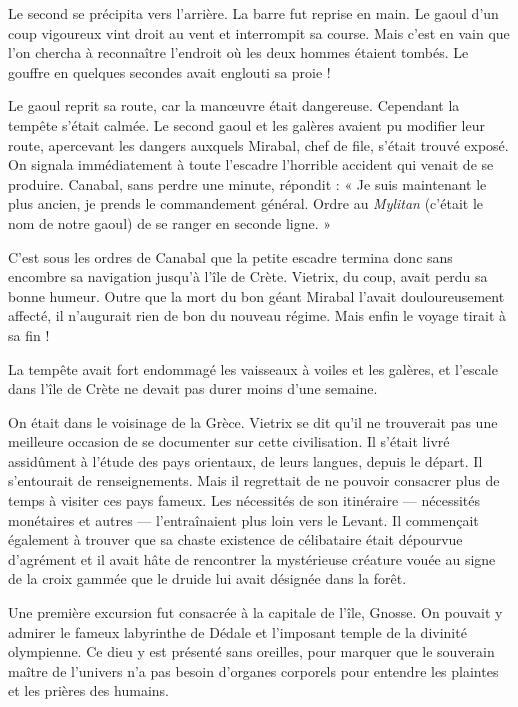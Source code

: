 \documentclass[a4paper, 11pt, oneside, polutonikogreek, french]{article}
\begin{document}
Le second se précipita vers l'arrière. La barre fut reprise en main. Le gaoul d'un coup vigoureux vint droit au vent et interrompit sa course. Mais c'est en vain que l'on chercha à reconnaître l'endroit où les deux hommes étaient tombés. Le gouffre en quelques secondes avait englouti sa proie !

Le gaoul reprit sa route, car la manœuvre était dangereuse. Cependant la tempête s'était calmée. Le second gaoul et les galères avaient pu modifier leur route, apercevant les dangers auxquels Mirabal, chef de file, s'était trouvé exposé. On signala immédiatement à toute l'escadre l'horrible accident qui venait de se produire. Canabal, sans perdre une minute, répondit : « Je suis maintenant le plus ancien, je prends le commandement général. Ordre au \emph{Mylitan} (c'était le nom de notre gaoul) de se ranger en seconde ligne. »

C'est sous les ordres de Canabal que la petite escadre termina donc sans encombre sa navigation jusqu'à l'île de Crète. Vietrix, du coup, avait perdu sa bonne humeur. Outre que la mort du bon géant Mirabal l'avait douloureusement affecté, il n'augurait rien de bon du nouveau régime. Mais enfin le voyage tirait à sa fin !

La tempête avait fort endommagé les vaisseaux à voiles et les galères, et l'escale dans l'île de Crète ne devait pas durer moins d'une semaine.

On était dans le voisinage de la Grèce. Vietrix se dit qu'il ne trouverait pas une meilleure occasion de se documenter sur cette civilisation. Il s'était livré assidûment à l'étude des pays orientaux, de leurs langues, depuis le départ. Il s'entourait de renseignements. Mais il regrettait de ne pouvoir consacrer plus de temps à visiter ces pays fameux. Les nécessités de son itinéraire --- nécessités monétaires et autres --- l'entraînaient plus loin vers le Levant. Il commençait également à trouver que sa chaste existence de célibataire était dépourvue d'agrément et il avait hâte de rencontrer la mystérieuse créature vouée au signe de la croix gammée que le druide lui avait désignée dans la forêt.

\bigskip
\centerline{\EightStarTaper}
\centerline{\EightStarTaper\EightStarTaper}
\bigskip

Une première excursion fut consacrée à la capitale de l'île, Gnosse. On pouvait y admirer le fameux labyrinthe de Dédale et l'imposant temple de la divinité olympienne. Ce dieu y est présenté sans oreilles, pour marquer que le souverain maître de l'univers n'a pas besoin d'organes corporels pour entendre les plaintes et les prières des humains.
\end{document}

